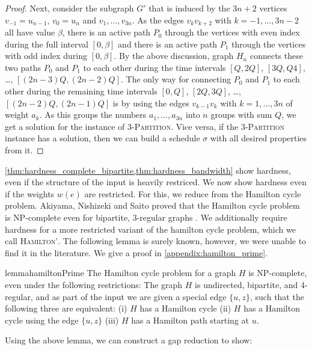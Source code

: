\documentclass[runningheads]{llncs}
\numberwithin{equation}{section}
\newcommand{\set}[1]{\{ #1 \}}
\begin{document}
\begin{proof}
Next, consider the subgraph $G'$ that is induced by the $3n+2$ vertices $v_{-1}=u_{n-1}$, $v_0=u_n$ and 
$v_1,\ldots,v_{3n}$.
As the edges $v_kv_{k+2}$ with $k=-1,\ldots,3n-2$ all have value $\beta$, there is an active path $P_0$ 
through the vertices with even index during the full interval $[0,\beta]$ and there is an active 
path $P_1$ through the vertices with odd index during $[0, \beta]$.
By the above discussion, graph $H_n$ connects these two paths $P_0$ and $P_1$ to each other during the
time intervals $[Q,2Q]$, $[3Q,Q4]$, \dots, $[(2n-3)Q,(2n-2)Q]$.
The only way for connecting $P_0$ and $P_1$ to each other during the remaining time intervals 
$[0,Q]$, $[2Q,3Q]$, \dots, $[(2n-2)Q,(2n-1)Q]$ is by using the edges $v_{k-1}v_k$ with $k=1,\ldots,3n$ of 
weight $a_k$.
As this groups the numbers $a_1,\ldots,a_{3n}$ into $n$ groups with sum $Q$, we get a solution
for the instance of \textsc{3-Partition}.
Vice versa, if the \textsc{3-Partition} instance has a solution, then we can build a schedule $\sigma$
with all desired properties from it.
\end{proof}

\cref{thm:hardness_complete_bipartite,thm:hardness_bandwidth} show hardness, even if the structure of the input is heavily restriced. We now show hardness even if the weights $w(e)$ are restricted. For this, we reduce from the Hamilton cycle problem. Akiyama, Nishizeki and Saito proved that the Hamilton cycle problem is NP-complete even for bipartite, 3-regular graphs \cite{hamilton3regularBip}. We additionally require hardness for a more restricted variant of the hamilton cycle problem, which we call \textsc{Hamilton'}. The following lemma is surely known, however, we were unable to find it in the literature. We give a proof in \cref{appendix:hamilton_prime}.

\begin{restatable}{lemma}{hamiltonPrime}
\label{hamilton_cycle_lemma}
The Hamilton cycle problem for a graph $H$ is NP-complete, even under the following restrictions: The graph $H$ is undirected, bipartite, and 4-regular, and as part of the input we are given a special edge $\set{u, z}$, such that the following three are equivalent: (i) $H$ has a Hamilton cycle (ii) $H$ has a Hamilton cycle using the edge $\set{u, z}$ (iii) $H$ has a Hamilton path starting at $u$.
\end{restatable} 

Using the above lemma, we can construct a gap reduction to show:
\end{document}
